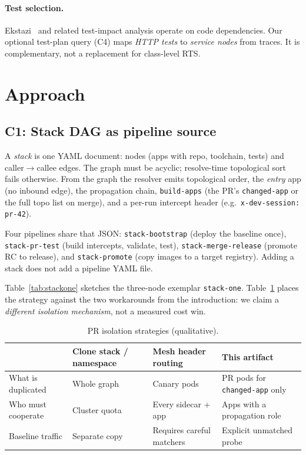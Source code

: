 \documentclass[10pt,conference]{IEEEtran}
\begin{document}
\paragraph{Test selection.}
Ekstazi~\cite{gligoric2015ekstazi} and related test-impact analysis operate on code dependencies. Our optional test-plan query (C4) maps \emph{HTTP tests} to \emph{service nodes} from traces. It is complementary, not a replacement for class-level RTS.

\section{Approach}
\label{sec:approach}

\subsection{C1: Stack DAG as pipeline source}
A \emph{stack} is one YAML document: nodes (apps with repo, toolchain, tests) and caller$\rightarrow$callee edges. The graph must be acyclic; resolve-time topological sort fails otherwise. From the graph the resolver emits topological order, the \emph{entry} app (no inbound edge), the propagation chain, \texttt{build-apps} (the PR's \texttt{changed-app} or the full topo list on merge), and a per-run intercept header (e.g.\ \texttt{x-dev-session: pr-42}).

Four pipelines share that JSON: \texttt{stack-bootstrap} (deploy the baseline once), \texttt{stack-pr-test} (build intercepts, validate, test), \texttt{stack-merge-release} (promote RC to release), and \texttt{stack-promote} (copy images to a target registry). Adding a stack does not add a pipeline YAML file.

Table~\ref{tab:stackone} sketches the three-node exemplar \texttt{stack-one}. Table~\ref{tab:compare} places the strategy against the two workarounds from the introduction: we claim a \emph{different isolation mechanism}, not a measured cost win.

\begin{table}[!t]
\centering
\caption{PR isolation strategies (qualitative).}
\label{tab:compare}
\begin{tabular}{@{}>{\raggedright\arraybackslash}p{}
                >{\raggedright\arraybackslash}p{}
                >{\raggedright\arraybackslash}p{}
                >{\raggedright\arraybackslash}p{}@{}}
\toprule
 & Clone stack / namespace & Mesh header routing & This artifact \\
\midrule
What is duplicated & Whole graph & Canary pods & PR pods for \texttt{changed-app} only \\
Who must cooperate & Cluster quota & Every sidecar + app & Apps with a propagation role \\
Baseline traffic & Separate copy & Requires careful matchers & Explicit unmatched probe \\
\bottomrule
\end{tabular}
\end{table}
\end{document}
